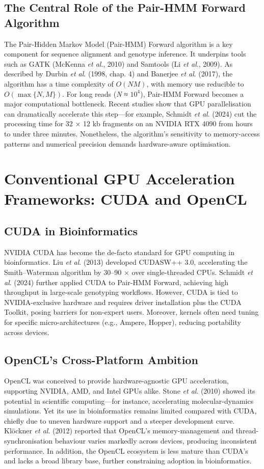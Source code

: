 \documentclass[PhD]{PHlab-thesis}
\begin{document}
\subsection{The Central Role of the Pair-HMM Forward Algorithm}
The Pair-Hidden Markov Model (Pair-HMM) Forward algorithm is a key component for sequence alignment and genotype inference. It underpins tools such as GATK (McKenna \emph{et al}., 2010) and Samtools (Li \emph{et al}., 2009). As described by Durbin \emph{et al}. (1998, chap. 4) and Banerjee \emph{et al}. (2017), the algorithm has a time complexity of $O(NM)$, with memory use reducible to $O(\max\{N,M\})$. For long reads (\emph{N} ≈ $10^{4}$), Pair-HMM Forward becomes a major computational bottleneck. Recent studies show that GPU parallelisation can dramatically accelerate this step—for example, Schmidt \emph{et al}. (2024) cut the processing time for 32 × 12 kb fragments on an NVIDIA RTX 4090 from hours to under three minutes. Nonetheless, the algorithm's sensitivity to memory-access patterns and numerical precision demands hardware-aware optimisation.

\section{Conventional GPU Acceleration Frameworks: CUDA and OpenCL}

\subsection{CUDA in Bioinformatics}
NVIDIA CUDA has become the de-facto standard for GPU computing in bioinformatics. Liu \emph{et al}. (2013) developed CUDASW++ 3.0, accelerating the Smith–Waterman algorithm by 30–90 × over single-threaded CPUs. Schmidt \emph{et al}. (2024) further applied CUDA to Pair-HMM Forward, achieving high throughput in large-scale genotyping workflows. However, CUDA is tied to NVIDIA-exclusive hardware and requires driver installation plus the CUDA Toolkit, posing barriers for non-expert users. Moreover, kernels often need tuning for specific micro-architectures (e.g., Ampere, Hopper), reducing portability across devices.

\subsection{OpenCL's Cross-Platform Ambition}
OpenCL was conceived to provide hardware-agnostic GPU acceleration, supporting NVIDIA, AMD, and Intel GPUs alike. Stone \emph{et al}. (2010) showed its potential in scientific computing—for instance, accelerating molecular-dynamics simulations. Yet its use in bioinformatics remains limited compared with CUDA, chiefly due to uneven hardware support and a steeper development curve. Klöckner \emph{et al}. (2012) reported that OpenCL's memory-management and thread-synchronisation behaviour varies markedly across devices, producing inconsistent performance. In addition, the OpenCL ecosystem is less mature than CUDA's and lacks a broad library base, further constraining adoption in bioinformatics.
\end{document}
